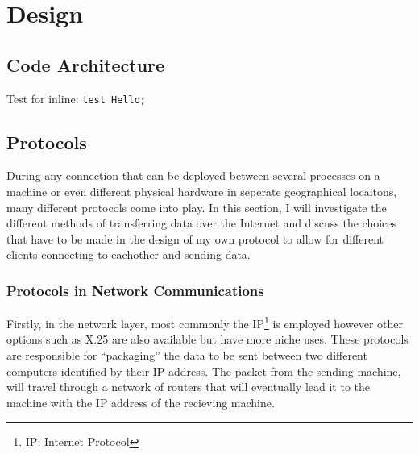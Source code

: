 \chapter{Design}

\section{Code Architecture}

Test for inline: \lstinline{test Hello;}

\section{Protocols}
During any connection that can be deployed between several processes on a machine or even different physical hardware in seperate geographical locaitons, many different protocols come into play. In this section, I will investigate the different methods of transferring data over the Internet and discuss the choices that have to be made in the design of my own protocol to allow for different clients connecting to eachother and sending data.

\subsection{Protocols in Network Communications}
Firstly, in the network layer, most commonly the IP\footnote{IP: Internet Protocol} is employed however other options such as X.25 are also available but have more niche uses. These protocols are responsible for ``packaging'' the data to be sent between two different computers identified by their IP address. The packet from the sending machine, will travel through a network of routers that will eventually lead it to the machine with the IP address of the recieving machine.

